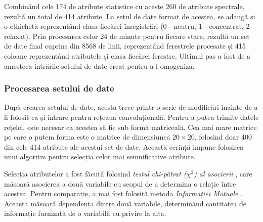 Combinând cele 174 de atribute statistice cu aceste 260 de atribute spectrale, rezultă un total de 414 atribute. La setul de date format de acestea, se adaugă și o ethichetă reprezentând clasa fiecărei înregistrări (0 - neutru, 1 - concentrat, 2 - relaxat). Prin procesarea celor 24 de minute pentru fiecare stare, rezultă un set de date final cuprins din 8568 de linii, reprezentând ferestrele procesate și 415 coloane reprezentând atributele și clasa fiecărei ferestre. Ultimul pas a fost de a amesteca intrările setului de date creat pentru a-l omogeniza.

\subsubsection*{Procesarea setului de date}\label{ssch:procesare-date}
După crearea setului de date, acesta trece printr-o serie de modificări înainte de a fi folosit ca și intrare pentru rețeaua convoluțională. Pentru a putea trimite datele rețelei, este necesar ca acestea să fie sub formă matriceală. Cea mai mare matrice pe care o putem forma este o matrice de dimensiunea $20\times20$, folosind doar 400 din cele 414 atribute ale acestui set de date. Această cerință impune folosirea unui algoritm pentru selecția celor mai semnificative atribute.

Selecția atributelor a fost făcută folosind \textit{testul chi-pătrat ($\chi^2$) al asocierii} \cite{online:chi-squared-pdf}, care măsoară asocierea a două variabile cu scopul de a determina o relație între acestea. Pentru comparație, a mai fost folosită metoda \textit{Informației Mutuale} \cite{online:info-mutuala}. Aceasta măsoară dependența dintre două variabile, determinând cantitatea de informație furnizată de o variabilă cu privire la alta.

